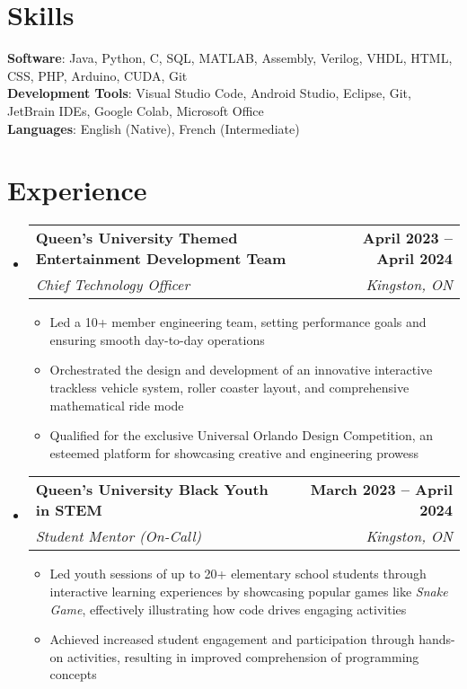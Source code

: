 \documentclass[letterpaper,11pt]{article}
\makeatletter
\newcommand{\resumeItem}[1]{
  \item\small{
    {#1 \vspace{-2pt}}
  }
}
\newcommand{\resumeSubheading}[4]{
  \vspace{-2pt}\item
    \begin{tabular*}{1.0\textwidth}[t]{l@{\extracolsep{\fill}}r}
      \textbf{#1} & \textbf{\small #2} \\
      \textit{\small#3} & \textit{\small #4} \\
    \end{tabular*}\vspace{-7pt}
}
\newcommand{\resumeSubHeadingListStart}{\begin{itemize}[leftmargin=0.0in, label={}]}
\newcommand{\resumeSubHeadingListEnd}{\end{itemize}}
\newcommand{\resumeItemListStart}{\begin{itemize}}
\newcommand{\resumeItemListEnd}{\end{itemize}\vspace{-5pt}}
\makeatother
\begin{document}
\section{Skills}
 \begin{itemize}[leftmargin=0.15in, label={}]
    \small{\item{
     \textbf{Software}{: Java, Python, C, SQL, MATLAB, Assembly, Verilog, VHDL, HTML, CSS, PHP, Arduino, CUDA, Git} \\
    \textbf{Development Tools}{: Visual Studio Code, Android Studio, Eclipse, Git, JetBrain IDEs, Google Colab, Microsoft Office} \\
    \textbf{Languages}{: English (Native), French (Intermediate)} \\
    }}
 \end{itemize}
 \vspace{-16pt}



\section{Experience}
  \resumeSubHeadingListStart

    \resumeSubheading
      {Queen's University Themed Entertainment Development Team}{April 2023 -- April 2024}
      {Chief Technology Officer}{Kingston, ON}
      \resumeItemListStart
        \resumeItem{Led a 10+ member engineering team, setting performance goals and ensuring smooth day-to-day operations}
        \resumeItem{Orchestrated the design and development of an innovative interactive trackless vehicle system, roller coaster layout, and comprehensive mathematical ride mode}
        \resumeItem{Qualified for the exclusive Universal Orlando Design Competition, an esteemed platform for showcasing creative and engineering prowess}
      \resumeItemListEnd

    \resumeSubheading
    {Queen's University Black Youth in STEM}{March  2023 -- April 2024}{Student Mentor (On-Call)}{Kingston, ON}
    \resumeItemListStart
        \resumeItem{Led youth sessions of up to 20+ elementary school students through interactive learning experiences by showcasing popular games like \textit{Snake Game}, effectively illustrating how code drives engaging activities}
        \resumeItem{Achieved increased student engagement and participation through hands-on activities, resulting in improved comprehension of programming concepts}
    \resumeItemListEnd
    
  \resumeSubHeadingListEnd
\vspace{-16pt}
\end{document}
